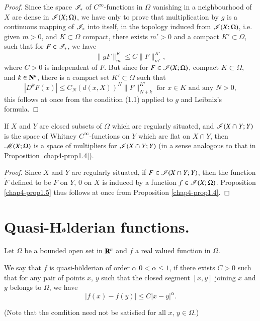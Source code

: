 \begin{proof}
 Since the space $\mathscr{I}_\ast$ of $C^\infty$-functions in $\Omega$ vanishing in a neighbourhood of $X$ are dense in $\mathscr{I} (X; \Omega)$, we have only to prove that multiplication by $g$ is a continuous mapping of $\mathscr{I}_\ast$ into itself, in the topology induced from $\mathscr{I}(X;\Omega)$, i.e. given $m >0$, and $K \subset \Omega$ compact, there exists $m' >0$ and a compact $K'\subset \Omega$, such that for $F \in \mathscr{I}_\ast$, we have
  $$
\|gF\|^K_m \leq C \| F \|^{K'}_{m'}  ,
$$\pageoriginale
where $C>0$ is independent of $F$. But since for $F \in \mathscr{I} (X; \Omega)$, compact $K \subset \Omega$, and $k \in \mathbf{N}^n$, there is a compact set $K' \subset \Omega$ such that
$$
|D^k F (x)| \leq C_N(d(x,X))^N \| F \|^{K'}_{N+k} \text{ for } x \in K \text{ and any } N > 0,
$$
this follows at once from the condition (1.1) applied to $g$ and Leibniz's formula.
\end{proof}

\begin{proposition}\label{chap4-prop1.5}%
  If $X$ and $Y$ are closed subsets of $\Omega$ which are regularly situated, and $\mathscr{I}(X \cap Y; Y)$ is the space of Whitney $C^\infty$-functions on $Y$ which are flat on $X \cap Y$, then $\mathscr{M}(X;\Omega)$ is a space of multipliers for $\mathscr{I}(X \cap Y ; Y)$ (in a sense analogous to that in Proposition \ref{chap4-prop1.4}).
\end{proposition}

\begin{proof}
Since $X$ and $Y$ are regularly situated, if $F \in \mathscr{I}(X \cap Y;Y)$, then the function $\tilde{F}$ defined to be $F$ on $Y$, 0 on $X$ is induced by a function $f \in \mathscr{I}(X;\Omega)$. Proposition \ref{chap4-prop1.5} thus follows at once from Proposition \ref{chap4-prop1.4}.
\end{proof}


\section[Quasi-H$\ddot{\rm {\bf o}}$lderian functions]{Quasi-H$\ddot{\rm {\bf o}}$lderian functions.} \label{chap4-sec2}

Let $\Omega$ be a bounded open set in $\mathbf{R}^n$ and $f$ a real valued function in $\Omega$.\

\begin{definition}\label{chap4-def2.1}%
We say that $f$ is quasi-h\"olderian of order $\alpha$ $0< \alpha \leq 1 $, if there exists $C > 0$ such that for any pair of points $x$, $y$ such that the closed segment $[x,y]$ joining $x$ and $y$ belongs to $\Omega$, we have 
$$
|f(x) - f (y)| \leq C |x - y|^\alpha.
$$
\end{definition}
\noindent
(Note that the condition need not be satisfied for all $x$, $y \in \Omega$.)

